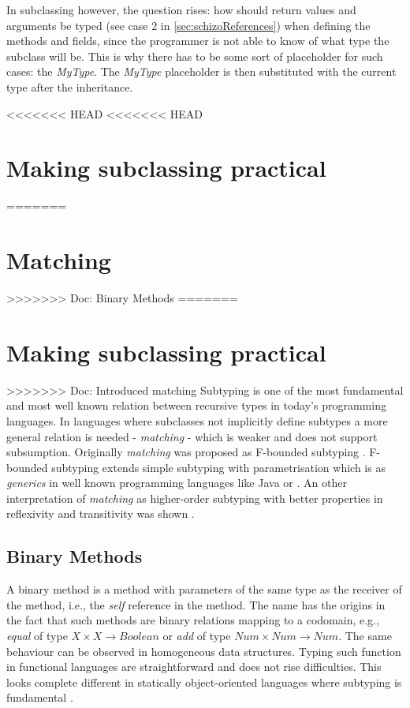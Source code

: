 In subclassing however, the question rises: how should return values
and arguments be typed (see case 2 in \ref{sec:schizoReferences})
when defining the methods and fields, since the programmer is not able
to know of what type the subclass will be. This is why there has to
be some sort of placeholder for such cases: the \emph{MyType}. The
\emph{MyType} placeholder is then substituted with the current type
after the inheritance.

<<<<<<< HEAD
<<<<<<< HEAD
\chapter{Making subclassing practical}
=======
\chapter{Matching}
>>>>>>> Doc: Binary Methods
=======
\chapter{Making subclassing practical}

>>>>>>> Doc: Introduced matching
Subtyping is one of the most fundamental and most well known relation
between recursive types in today's programming languages. In languages
where subclasses not implicitly define subtypes a more general
relation is needed - \emph{matching} - which is weaker and does
not support subsumption. Originally \emph{matching} was proposed
as F-bounded subtyping \cite{canning_f-bounded_1989}. F-bounded
subtyping extends simple subtyping with parametrisation which is as
\emph{generics} in well known programming languages like Java or \CS
\cite{barron-estrada_inheritance_2003}. An other interpretation of
\emph{matching} as higher-order subtyping with better properties in
reflexivity and transitivity was shown \cite{abadi_subtyping_1996}.

\section{Binary Methods}
A binary method is a method with parameters of the same type as the
receiver of the method, i.e., the \emph{self} reference in the method. The
name has the origins in the fact that such methods are binary relations
mapping to a codomain, e.g., \emph{equal} of type $X \times X \rightarrow
Boolean$ or \emph{add} of type $Num \times Num \rightarrow Num$. The
same behaviour can be observed in homogeneous data structures. Typing
such function in functional languages are straightforward and does not
rise difficulties. This looks complete different in statically object-oriented
languages where subtyping is fundamental \cite{bruce_binary_1995}.

